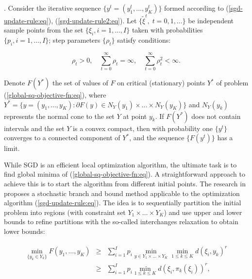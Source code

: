 \begin{theorem}
    \label{Theorem 1}
    \cite{Ermoliev_Norkin_2003,Ermolev_Norkin_1998}. Consider the iterative sequence $\{ y^t = (y_1^t, \ldots, y_K^t) \}$ formed according to (\ref{sgd-update-rule:eq}), (\ref{sgd-update-rule2:eq}). Let $\{ \tilde{\xi}^t,\;t=0,1,\ldots\}$ be independent sample points from the set $\{ \xi_i, i = 1, \ldots, I \}$ taken with probabilities $\{ p_i, i = 1, \ldots, I \}$; step parameters $\{\rho_t\}$ satisfy conditions:

    \begin{equation}
        \label{sq-convergence-cond:eq}
        \rho_t > 0, \quad \sum_{t=0}^{\infty} \rho_t = \infty, \quad \sum_{t=0}^{\infty} \rho_t^2 < \infty.
    \end{equation}

    Denote $F(Y^{*})$ the set of values of $F$ on critical (stationary) points $Y^{*}$ of problem (\ref{global-sq-objective-fn:eq}), where $Y^{*} = \{ y = (y_1, \ldots, y_K): \partial F(y) \in N_Y (y_1) \times \ldots \times N_Y (y_K) \}$ and $N_Y (y_k)$ represents the normal cone to the set $Y$ at point $y_k$. If $F(Y^{*})$ does not contain intervals and the set $Y$ is a convex compact, then with probability one $\{ y^t \}$ converges to a connected component of $Y^{*}$, and the sequence $\{ F(y^t) \}$ has a limit.
\end{theorem}

While SGD is an efficient local optimization algorithm, the ultimate task is to find global minima of (\ref{global-sq-objective-fn:eq}). A straightforward approach to achieve this is to start the algorithm from different initial points. The research in \cite{Norkin_Pflug_Ruszczynski_1998} proposes a stochastic branch and bound method applicable to the optimization algorithm (\ref{sgd-update-rule:eq}). The idea is to sequentially partition the initial problem into regions (with constraint set $Y_1 \times \ldots \times Y_K$) and use upper and lower bounds to refine partitions with the so-called interchanges relaxation to obtain lower bounds:

\begin{eqnarray}
    \label{sq-branch-bound:eq}
    \begin{aligned}
        \min_{\{ y_k \in Y_k \}} F(y_1, \ldots, y_K)
        &\geq& \sum_{i=1}^I p_i \min_{y \in Y_1\times\ldots\times Y_K} \min_{1 \leq k \leq K} d(\xi_i, y_k)^r \\
        &\geq& \sum_{i=1}^I p_i \min_{1 \leq k \leq K} d(\xi_i, \pi_k(\xi_i))^r,
    \end{aligned}
\end{eqnarray}

